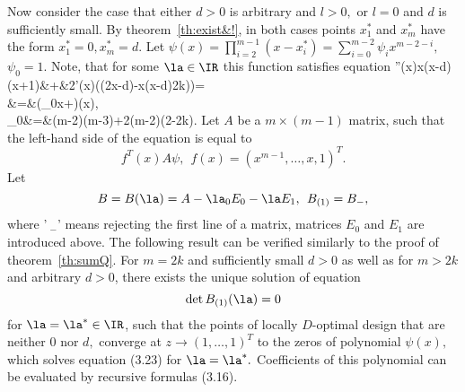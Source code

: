 Now consider the case that either $d>0$ is arbitrary and $l>0,$
or $l=0$ and $d$ is sufficiently small.
By theorem~\ref{th:exist&!}, in both cases points $x^*_1$ and $x^*_m$
have the form $x^*_1=0,x^*_m=d.$
Let $\psi(x)=\prod_{i=2}^{m-1}(x-x^*_i)=\sum_{i=0}^{m-2}\psi_ix^{m-2-i},$
$\psi_0=1.$ Note, that for some $\la\in\IR$ this function satisfies
equation
\bea
 \psi''(x)x(x-d)(x+1)&+&2\psi'(x)((2x-d)-x(x-d)2k))=\nonumber \\
&=&(\la_0x+\la)\psi(x),\\
\label{eq:eq_for_psi&la}
 \la_0&=&(m-2)(m-3)+2(m-2)(2-2k).\nonumber
\eea
Let $A$ be a $m\times (m-1)$ matrix, such that the left-hand side of the
equation is equal to
$$
 f^T(x)A\psi,\>\>f(x)=(x^{m-1},\ldots,x,1)^T.
$$
Let
$$
 B=B(\la)=A-\la_0E_0-\la E_1,\>\>B_{(1)}=B_{-},
$$
where '$\>\!\!_{-}$' means rejecting the first line of a matrix,
matrices $E_0$ and $E_1$ are introduced above.
The following result can be verified similarly to the proof of
theorem~\ref{th:sumQ}.
\bt
 For $m=2k$ and sufficiently small $d>0$ as well as for $m>2k$ and
 arbitrary $d>0$, there exists the unique solution of equation
$$
 \det B_{(1)}(\la)=0
 $$
 for $\la=\la^*\in\IR$, such that the points of locally $D$-optimal
 design that are neither $0$ nor $d,$ converge at $z\to (1,\ldots,1)^T$
 to the zeros of polynomial $\psi(x),$ which solves equation (3.23) for
 $\la=\la^*.$ Coefficients of this polynomial can be evaluated by recursive
 formulas (3.16).
\et



